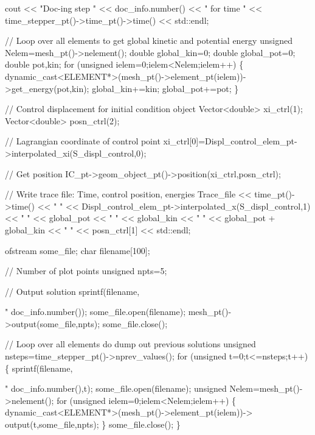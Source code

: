 \begin{DoxyCodeInclude}
 cout << \textcolor{stringliteral}{"Doc-ing step "} <<  doc\_info.number()
      << \textcolor{stringliteral}{" for time "} << time\_stepper\_pt()->time\_pt()->time() << std::endl;
  
  
 \textcolor{comment}{// Loop over all elements to get global kinetic and potential energy}
 \textcolor{keywordtype}{unsigned} Nelem=mesh\_pt()->nelement();
 \textcolor{keywordtype}{double} global\_kin=0;
 \textcolor{keywordtype}{double} global\_pot=0;
 \textcolor{keywordtype}{double} pot,kin;
 \textcolor{keywordflow}{for} (\textcolor{keywordtype}{unsigned} ielem=0;ielem<Nelem;ielem++)
  \{
   \textcolor{keyword}{dynamic\_cast<}ELEMENT*\textcolor{keyword}{>}(mesh\_pt()->element\_pt(ielem))->get\_energy(pot,kin);
   global\_kin+=kin;
   global\_pot+=pot;
  \}
  

 \textcolor{comment}{// Control displacement for initial condition object}
 Vector<double> xi\_ctrl(1);
 Vector<double> posn\_ctrl(2);
  
 \textcolor{comment}{// Lagrangian coordinate of control point}
 xi\_ctrl[0]=Displ\_control\_elem\_pt->interpolated\_xi(S\_displ\_control,0);
  
 \textcolor{comment}{// Get position}
 IC\_pt->geom\_object\_pt()->position(xi\_ctrl,posn\_ctrl);
 
 \textcolor{comment}{// Write trace file: Time, control position, energies}
 Trace\_file << time\_pt()->time()  << \textcolor{stringliteral}{" "} 
            << Displ\_control\_elem\_pt->interpolated\_x(S\_displ\_control,1) 
            << \textcolor{stringliteral}{" "} << global\_pot  << \textcolor{stringliteral}{" "} << global\_kin
            << \textcolor{stringliteral}{" "} << global\_pot + global\_kin 
            << \textcolor{stringliteral}{" "} << posn\_ctrl[1]
            << std::endl; 
  
  
 ofstream some\_file;
 \textcolor{keywordtype}{char} filename[100];
  
 \textcolor{comment}{// Number of plot points}
 \textcolor{keywordtype}{unsigned} npts=5;

 \textcolor{comment}{// Output solution }
 sprintf(filename,\textcolor{stringliteral}{"%
         doc\_info.number());
 some\_file.open(filename);
 mesh\_pt()->output(some\_file,npts);
 some\_file.close();

 \textcolor{comment}{// Loop over all elements do dump out previous solutions}
 \textcolor{keywordtype}{unsigned} nsteps=time\_stepper\_pt()->nprev\_values();
 \textcolor{keywordflow}{for} (\textcolor{keywordtype}{unsigned} t=0;t<=nsteps;t++)
  \{     
   sprintf(filename,\textcolor{stringliteral}{"%
           doc\_info.number(),t);
   some\_file.open(filename);
   \textcolor{keywordtype}{unsigned} Nelem=mesh\_pt()->nelement();
   \textcolor{keywordflow}{for} (\textcolor{keywordtype}{unsigned} ielem=0;ielem<Nelem;ielem++)
    \{
     \textcolor{keyword}{dynamic\_cast<}ELEMENT*\textcolor{keyword}{>}(mesh\_pt()->element\_pt(ielem))->
      output(t,some\_file,npts);
    \}
   some\_file.close();
  \}
  
}}
\end{DoxyCodeInclude}
